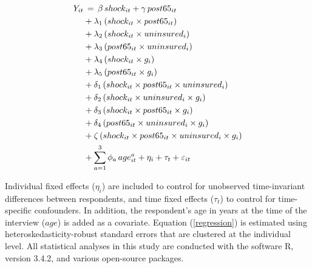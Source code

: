 \documentclass[12pt]{article}
\begin{document}
\begin{align} \label{regression}
Y_{it}& \thinspace  = \thinspace
				\beta \thinspace shock_{it} + \gamma \thinspace post65_{it} \\
				&+\lambda_1 \thinspace  (shock_{it} \times post65_{it}) \nonumber \\
				&+ \lambda_2 \thinspace (shock_{it} \times uninsured_i) \nonumber \\
				&+\lambda_3  \thinspace (post65_{it} \times uninsured_i) \nonumber \\
				&+ \lambda_4 \thinspace (shock_{it} \times g_i) \nonumber \\
				&+\lambda_5 \thinspace (post65_{it} \times g_i) \nonumber \\
				&+ \delta_1 \thinspace (shock_{it} \times post65_{it} \times uninsured_i) \nonumber \\
				&+ \delta_2 \thinspace (shock_{it} \times uninsured_i \times g_i) \nonumber \\
				&+ \delta_3 \thinspace (shock_{it} \times post65_{it} \times g_i) \nonumber \\
				&+ \delta_4 \thinspace (post65_{it} \times uninsured_i \times g_i) \nonumber\\
				&+ \zeta \thinspace (shock_{it} \times post65_{it} \times uninsured_i \times g_i) \nonumber \\
				&+ \sum_{a=1}^3 \phi_a \thinspace age_{it}^{a} + \eta_i + \tau_t + \varepsilon_{it} \nonumber
\end{align}

Individual fixed effects ($\eta_i$) are included to control for unobserved time-invariant differences between respondents, and time fixed effects ($\tau_t$) to control for time-specific confounders. In addition, the respondent's age in years at the time of the interview ($age$) is added as a covariate. Equation (\ref{regression}) is estimated using heteroskedasticity-robust standard errors that are clustered at the individual level. All statistical analyses in this study are conducted with the software R, version 3.4.2, and various open-source packages.\cite{broom,car,ggplot2,haven,labelled,lmtest,multcomp,plm,plyr,readr,readxl,reshape2,sandwich,scales,stargazer,stringr,tidyverse}
\end{document}
